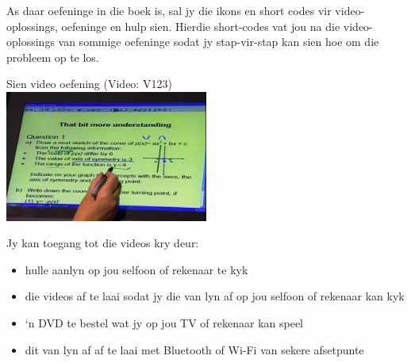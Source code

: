 {\Large

As daar oefeninge in die boek is, sal jy die ikons en short codes vir video-oplossings, oefeninge en hulp sien. Hierdie short-codes vat jou na die video-oplossings van sommige oefeninge sodat jy stap-vir-stap kan sien hoe om die probleem op te los. \par

\begin{center}
Sien video oefening  (Video: V123) \\
\includegraphics[width=0.5\textwidth]{title_images/mindsetexercise.png}
\end{center}
\par
Jy kan toegang tot die videos kry deur:
\begin{itemize}
    \item hulle aanlyn op jou selfoon of rekenaar te kyk
    \item die videos af te laai sodat jy die van lyn af op jou selfoon of rekenaar kan kyk
    \item ‘n DVD te bestel wat jy op jou TV of rekenaar kan speel
    \item dit van lyn af af te laai met Bluetooth of Wi-Fi van sekere afsetpunte
\end{itemize}
}


